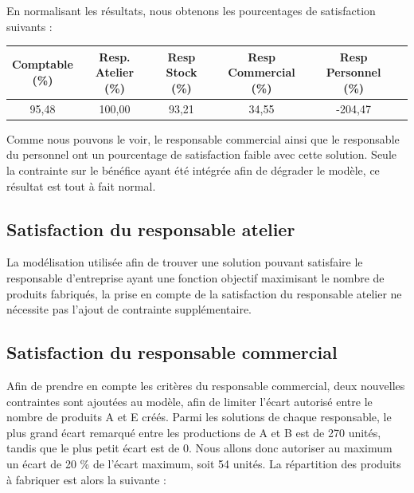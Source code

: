 \documentclass[paper=a4, fontsize=11pt]{report}
\numberwithin{equation}{section}		%
\numberwithin{figure}{section}			%
\numberwithin{table}{section}				%
\begin{document}
En normalisant les résultats, nous obtenons les pourcentages de satisfaction suivants : 

\begin{table}[H]
\begin{center}
\begin{tabular}{c|ccccc}
\shortstack{Comptable \\ \scriptsize{(\%)}} & \shortstack{Resp. Atelier \\ \scriptsize (\%)} & \shortstack{Resp Stock \\ \scriptsize (\%)} & \shortstack{Resp Commercial \\ \scriptsize (\%)} &   \shortstack{Resp Personnel \\ \scriptsize (\%)} \\ 
\hline 
95,48 & 100,00 & 93,21 & 34,55 & -204,47 \\
\end{tabular}
\end{center}
\end{table}

Comme nous pouvons le voir, le responsable commercial ainsi que le responsable du personnel ont un pourcentage de satisfaction faible avec cette solution. Seule la contrainte sur le bénéfice ayant été intégrée afin de dégrader le modèle, ce résultat est tout à fait normal.

\subsection{Satisfaction du responsable atelier}

La modélisation utilisée afin de trouver une solution pouvant satisfaire le responsable d'entreprise ayant une fonction objectif maximisant le nombre de produits fabriqués, la prise en compte de la satisfaction du responsable atelier ne nécessite pas l'ajout de contrainte supplémentaire.

\subsection{Satisfaction du responsable commercial}

Afin de prendre en compte les critères du responsable commercial, deux nouvelles contraintes sont ajoutées au modèle, afin de limiter l'écart autorisé entre le nombre de produits A et E créés. Parmi les solutions de chaque responsable, le plus grand écart remarqué entre les productions de A et B est de 270 unités, tandis que le plus petit écart est de 0. Nous allons donc autoriser au maximum un écart de 20 \% de l'écart maximum, soit 54 unités. La répartition des produits à fabriquer est alors la suivante : 
\end{document}

